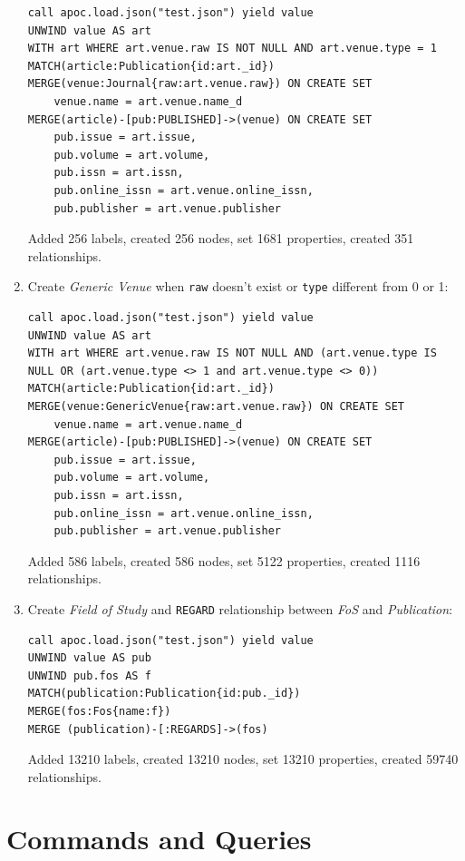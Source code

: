 \documentclass{Configuration_Files/PoliMi3i_thesis}
\begin{document}
\begin{enumerate}
        \begin{lstlisting}[language=cypher, label=lst:cypher-example]
call apoc.load.json("test.json") yield value
UNWIND value AS art
WITH art WHERE art.venue.raw IS NOT NULL AND art.venue.type = 1
MATCH(article:Publication{id:art._id})
MERGE(venue:Journal{raw:art.venue.raw}) ON CREATE SET
    venue.name = art.venue.name_d
MERGE(article)-[pub:PUBLISHED]->(venue) ON CREATE SET
    pub.issue = art.issue,
    pub.volume = art.volume,
    pub.issn = art.issn,
    pub.online_issn = art.venue.online_issn,
    pub.publisher = art.venue.publisher
        \end{lstlisting}
        Added 256 labels, created 256 nodes, set 1681 properties, created 351 relationships.
    \item Create \emph{Generic Venue} when \verb |raw| doesn't exist or \verb |type| different from 0 or 1:
        \begin{lstlisting}[language=cypher, label=lst:cypher-example]
call apoc.load.json("test.json") yield value
UNWIND value AS art
WITH art WHERE art.venue.raw IS NOT NULL AND (art.venue.type IS NULL OR (art.venue.type <> 1 and art.venue.type <> 0))
MATCH(article:Publication{id:art._id})
MERGE(venue:GenericVenue{raw:art.venue.raw}) ON CREATE SET
    venue.name = art.venue.name_d
MERGE(article)-[pub:PUBLISHED]->(venue) ON CREATE SET
    pub.issue = art.issue,
    pub.volume = art.volume,
    pub.issn = art.issn,
    pub.online_issn = art.venue.online_issn,
    pub.publisher = art.venue.publisher
        \end{lstlisting}
        Added 586 labels, created 586 nodes, set 5122 properties, created 1116 relationships.
    \item Create \emph{Field of Study} and \verb |REGARD| relationship between \emph{FoS} and \emph{Publication}:
        \begin{lstlisting}[language=cypher, label=lst:cypher-example]
call apoc.load.json("test.json") yield value
UNWIND value AS pub
UNWIND pub.fos AS f
MATCH(publication:Publication{id:pub._id})
MERGE(fos:Fos{name:f})
MERGE (publication)-[:REGARDS]->(fos)
        \end{lstlisting}
        Added 13210 labels, created 13210 nodes, set 13210 properties, created 59740 relationships.
\end{enumerate}


\chapter{Commands and Queries}
\end{document}
